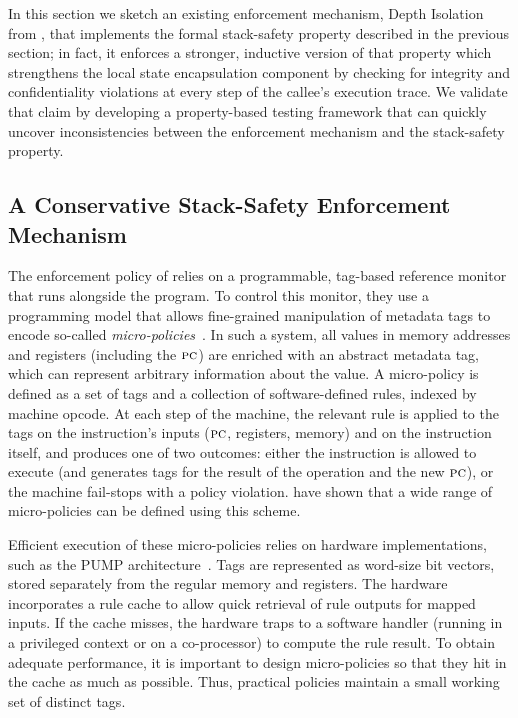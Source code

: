 \documentclass[acmsmall,review,anonymous]{acmart}\settopmatter{printfolios=true,printccs=false,printacmref=false}
\begin{document}

In this section we sketch an existing enforcement mechanism, Depth
Isolation from \citet{DBLP:conf/sp/RoesslerD18}, that implements the
formal stack-safety property described in the previous section; in
fact, it enforces a stronger, inductive version of that property which
strengthens the local state encapsulation component by checking for
integrity and confidentiality violations at every step of the callee's
execution trace. We validate that claim by developing a property-based
testing framework that can quickly uncover inconsistencies between the
enforcement mechanism and the stack-safety property.

\subsection*{A Conservative Stack-Safety Enforcement Mechanism}
%
The enforcement policy of \citeauthor{DBLP:conf/sp/RoesslerD18} relies
on a programmable, tag-based reference monitor that runs alongside the
program.  To control this monitor, they use a programming model that
allows fine-grained manipulation of metadata tags to encode so-called
\emph{micro-policies}~\citep{pump_oakland2015}.
In such a system, all values in
memory addresses and registers (including the $\textsc{pc}$)
are enriched with an abstract metadata tag, which can represent
arbitrary information about the value. A micro-policy is defined as a set of tags and a
collection of software-defined rules, indexed by machine opcode.
At each step of the machine, the relevant rule is applied to the tags on
the instruction's inputs ($\textsc{pc}$, registers, memory) and on the instruction itself, and produces
one of two outcomes: either the instruction is allowed to execute (and generates
tags for the result of the operation and the new $\textsc{pc}$), or the machine
fail-stops with a policy violation.
\citeauthor{pump_oakland2015} have shown that a wide range of micro-policies can
be defined using this scheme.

Efficient execution of these micro-policies relies on hardware implementations,
such as the PUMP architecture~\citep{pump:asplos2015}.  Tags are represented
as word-size bit vectors, stored separately from the regular memory and registers.
The hardware incorporates a rule cache
to allow quick retrieval of rule outputs for mapped inputs. If the cache misses,
the hardware traps to a software handler (running in a privileged context or
on a co-processor) to compute the rule result. To obtain adequate performance,
it is important to design micro-policies so that they hit in the cache as
much as possible. Thus, practical policies maintain a small working set of
distinct tags.
\end{document}
